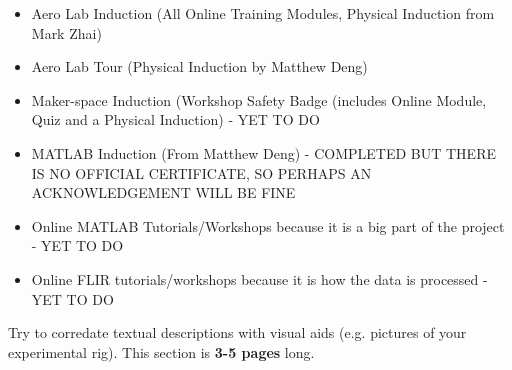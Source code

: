 \begin{itemize}
    \begin{itemize}
        \item Aero Lab Induction (All Online Training Modules, Physical Induction from Mark Zhai)
        \item Aero Lab Tour (Physical Induction by Matthew Deng)
        \item Maker-space Induction (Workshop Safety Badge (includes Online Module, Quiz and a Physical Induction) - YET TO DO
        \item MATLAB Induction (From Matthew Deng) - COMPLETED BUT THERE IS NO OFFICIAL CERTIFICATE, SO PERHAPS AN ACKNOWLEDGEMENT WILL BE FINE
        \item Online MATLAB Tutorials/Workshops because it is a big part of the project - YET TO DO
        \item Online FLIR tutorials/workshops because it is how the data is processed - YET TO DO
    \end{itemize}
\end{itemize}
Try to corredate textual descriptions with visual aids (e.g. pictures of your experimental rig).
This section is \textbf{3-5 pages} long. 